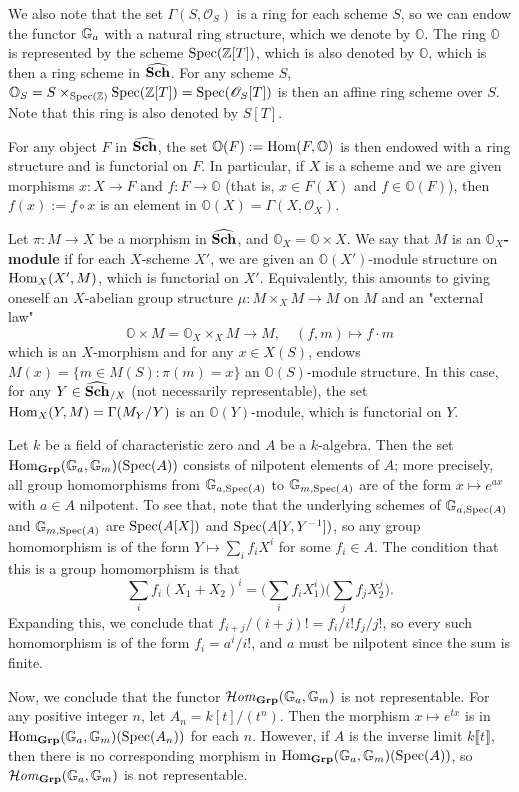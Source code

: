 We also note that the set $\Gamma(S,\mathscr{O}_S)$ is a ring for each scheme $S$, so we can endow the functor $\mathbb{G}_a$ with a natural ring structure, which we denote by $\mathbb{O}$. The ring $\mathbb{O}$ is represented by the scheme $\mathrm{Spec}(\mathbb{Z}[T])$, which is also denoted by $\mathbb{O}$, which is then a ring scheme in $\widehat{\mathbf{Sch}}$. For any scheme $S$, $\mathbb{O}_S=S\times_{\mathrm{Spec}(\mathbb{Z})}\mathrm{Spec}(\mathbb{Z}[T])=\mathrm{Spec}(\mathscr{O}_S[T])$ is then an affine ring scheme over $S$. Note that this ring is also denoted by $S[T]$.\par
For any object $F$ in $\widehat{\mathbf{Sch}}$, the set $\mathbb{O}(F):=\mathrm{Hom}(F,\mathbb{O})$ is then endowed with a ring structure and is functorial on $F$. In particular, if $X$ is a scheme and we are given morphisms $x:X\to F$ and $f:F\to\mathbb{O}$ (that is, $x\in F(X)$ and $f\in\mathbb{O}(F)$), then $f(x):=f\circ x$ is an element in $\mathbb{O}(X)=\Gamma(X,\mathscr{O}_X)$.

\begin{definition}
Let $\pi:M\to X$ be a morphism in $\widehat{\mathbf{Sch}}$, and $\mathbb{O}_X=\mathbb{O}\times X$. We say that $M$ is an \textbf{$\mathbb{O}_X$-module} if for each $X$-scheme $X'$, we are given an $\mathbb{O}(X')$-module structure on $\mathrm{Hom}_X(X',M)$, which is functorial on $X'$. Equivalently, this amounts to giving oneself an $X$-abelian group structure $\mu:M\times_XM\to M$ on $M$ and an "external law"
\[\mathbb{O}\times M=\mathbb{O}_X\times_XM\to M,\quad (f,m)\mapsto f\cdot m\]
which is an $X$-morphism and for any $x\in X(S)$, endows $M(x)=\{m\in M(S):\pi(m)=x\}$ an $\mathbb{O}(S)$-module structure. In this case, for any $Y\in\widehat{\mathbf{Sch}}_{/X}$ (not necessarily representable), the set $\mathrm{Hom}_X(Y,M)=\Gamma(M_Y/Y)$ is an $\mathbb{O}(Y)$-module, which is functorial on $Y$.
\end{definition}

\begin{example}
Let $k$ be a field of characteristic zero and $A$ be a $k$-algebra. Then the set $\mathrm{Hom}_{\mathbf{Grp}}(\mathbb{G}_a,\mathbb{G}_m)(\mathrm{Spec}(A))$ consists of nilpotent elements of $A$; more precisely, all group homomorphisms from $\mathbb{G}_{a,\mathrm{Spec}(A)}$ to $\mathbb{G}_{m,\mathrm{Spec}(A)}$ are of the form $x\mapsto e^{ax}$ with $a\in A$ nilpotent. To see that, note that the underlying schemes of $\mathbb{G}_{a,\mathrm{Spec}(A)}$ and $\mathbb{G}_{m,\mathrm{Spec}(A)}$ are $\mathrm{Spec}(A[X])$ and $\mathrm{Spec}(A[Y,Y^{-1}])$, so any group homomorphism is of the form $Y\mapsto\sum_if_iX^i$ for some $f_i\in A$. The condition that this is a group homomorphism is that
\[\sum_if_i(X_1+X_2)^i=\Big(\sum_if_iX_1^i\Big)\Big(\sum_jf_jX_2^j\Big).\]
Expanding this, we conclude that $f_{i+j}/(i+j)!=f_i/i!f_j/j!$, so every such homomorphism is of the form $f_i=a^i/i!$, and $a$ must be nilpotent since the sum is finite.\par
Now, we conclude that the functor $\operatorname{\mathcal{H}\hspace*{-0.4pt}\textit{om}\hspace{0.5pt}}_{\mathbf{Grp}}(\mathbb{G}_a,\mathbb{G}_m)$ is not representable. For any positive integer $n$, let $A_n=k[t]/(t^n)$. Then the morphism $x\mapsto e^{tx}$ is in $\mathrm{Hom}_{\mathbf{Grp}}(\mathbb{G}_a,\mathbb{G}_m)(\mathrm{Spec}(A_n))$ for each $n$. However, if $A$ is the inverse limit $k\llbracket t\rrbracket$, then there is no corresponding morphism in $\mathrm{Hom}_{\mathbf{Grp}}(\mathbb{G}_a,\mathbb{G}_m)(\mathrm{Spec}(A))$, so $\operatorname{\mathcal{H}\hspace*{-0.4pt}\textit{om}\hspace{0.5pt}}_{\mathbf{Grp}}(\mathbb{G}_a,\mathbb{G}_m)$ is not representable.
\end{example}

